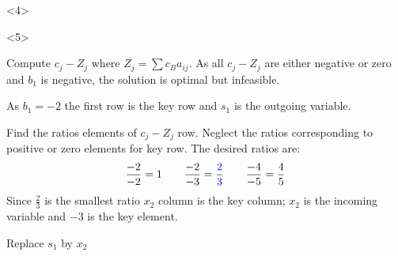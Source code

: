 \begin{frameExample}{}{}
    \begin{onlyenv}<4>
    {\centering
    \par}
\end{onlyenv}

  \begin{onlyenv}<5>
    {\centering
    \par}
\end{onlyenv}

\begin{description}\justifying
  \item<only@3>[Step 4.] Compute $c_j - Z_j$ where $Z_j = \sum c_B a_{ij}$. As all $c_j - Z_j$ are either negative or zero and $b_1$ is negative, \alert{the solution is optimal but infeasible.}
  \item<only@3>[Step 5.] As $b_1 = -2$ the first row is the key row and $s_1$ is the outgoing variable.
  \item<only@4>[Step 6.] Find the ratios elements of $c_j - Z_j$ row. \alert{Neglect the ratios corresponding to positive or zero elements for key row}. The desired ratios are:  \[ \frac{-2}{-2} = 1 \quad\quad \frac{-2}{-3}=\frac{\color{blue}2}{\color{blue}3} \quad\quad \frac{-4}{-5} = \frac{4}{5} \] Since $\frac{2}{3}$ \alert{is the smallest ratio} $x_2$ column is the key column; $x_2$ is the incoming variable and $-3$ is the key element.
  \item<only@5>[Step 7.] Replace  $s_1$ by $x_2$


\end{description}
\end{frameExample}
